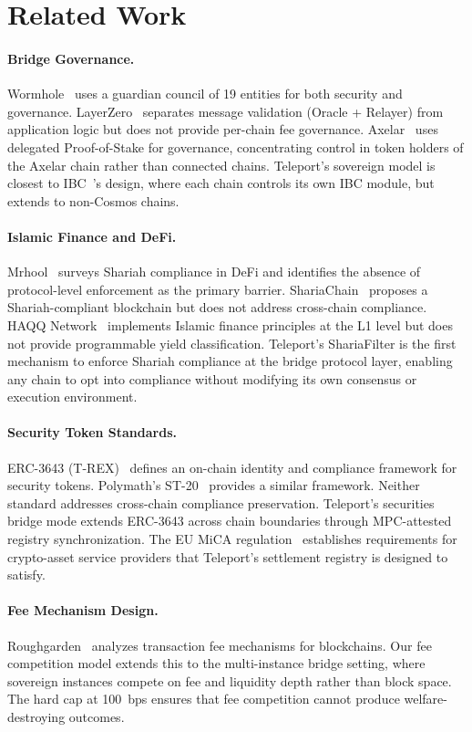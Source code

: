\section{Related Work}

\label{sec:related}

\paragraph{Bridge Governance.}
Wormhole~\cite{wormhole} uses a guardian council of 19 entities for both security and governance. LayerZero~\cite{layerzero} separates message validation (Oracle + Relayer) from application logic but does not provide per-chain fee governance. Axelar~\cite{axelar} uses delegated Proof-of-Stake for governance, concentrating control in token holders of the Axelar chain rather than connected chains. Teleport's sovereign model is closest to IBC~\cite{ibc}'s design, where each chain controls its own IBC module, but extends to non-Cosmos chains.

\paragraph{Islamic Finance and DeFi.}
Mrhool~\cite{mrhool2022} surveys Shariah compliance in DeFi and identifies the absence of protocol-level enforcement as the primary barrier. ShariaChain~\cite{shariachain2021} proposes a Shariah-compliant blockchain but does not address cross-chain compliance. HAQQ Network~\cite{haqq2023} implements Islamic finance principles at the L1 level but does not provide programmable yield classification. Teleport's ShariaFilter is the first mechanism to enforce Shariah compliance at the bridge protocol layer, enabling any chain to opt into compliance without modifying its own consensus or execution environment.

\paragraph{Security Token Standards.}
ERC-3643 (T-REX)~\cite{erc3643} defines an on-chain identity and compliance framework for security tokens. Polymath's ST-20~\cite{polymath2018} provides a similar framework. Neither standard addresses cross-chain compliance preservation. Teleport's securities bridge mode extends ERC-3643 across chain boundaries through MPC-attested registry synchronization. The EU MiCA regulation~\cite{mica2023} establishes requirements for crypto-asset service providers that Teleport's settlement registry is designed to satisfy.

\paragraph{Fee Mechanism Design.}
Roughgarden~\cite{roughgarden2021} analyzes transaction fee mechanisms for blockchains. Our fee competition model extends this to the multi-instance bridge setting, where sovereign instances compete on fee and liquidity depth rather than block space. The hard cap at 100~bps ensures that fee competition cannot produce welfare-destroying outcomes.

